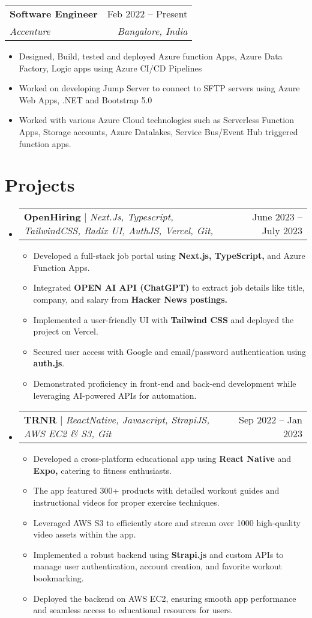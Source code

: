 \documentclass[letterpaper,11pt]{article}
\makeatletter
\newcommand{\resumeItem}[1]{
  \item\small{
    {#1 \vspace{-2pt}}
  }
}
\newcommand{\resumeSubheading}[4]{
  \vspace{-2pt}\item
    \begin{tabular*}{0.97\textwidth}[t]{l@{\extracolsep{\fill}}r}
      \textbf{#1} & #2 \\
      \textit{\small#3} & \textit{\small #4} \\
    \end{tabular*}\vspace{-7pt}
}
\newcommand{\resumeSubSubheading}[2]{
    \item
    \begin{tabular*}{0.97\textwidth}{l@{\extracolsep{\fill}}r}
      \textit{\small#1} & \textit{\small #2} \\
    \end{tabular*}\vspace{-7pt}
}
\newcommand{\resumeProjectHeading}[2]{
    \item
    \begin{tabular*}{0.97\textwidth}{l@{\extracolsep{\fill}}r}
      \small#1 & #2 \\
    \end{tabular*}\vspace{-7pt}
}
\newcommand{\resumeSubHeadingListStart}{\begin{itemize}[leftmargin=0.15in, label={}]}
\newcommand{\resumeSubHeadingListEnd}{\end{itemize}}
\newcommand{\resumeItemListStart}{\begin{itemize}}
\newcommand{\resumeItemListEnd}{\end{itemize}\vspace{-5pt}}
\makeatother
\begin{document}
    \resumeSubheading
      {Software Engineer}{Feb 2022 -- Present}
      {Accenture}{Bangalore, India}
      \resumeItemListStart
        \resumeItem{Designed, Build, tested and deployed Azure function Apps, Azure Data Factory, Logic apps using Azure CI/CD Pipelines}
        \resumeItem{Worked on developing Jump Server to connect to SFTP servers using Azure Web Apps, .NET and Bootstrap 5.0}
        \resumeItem{Worked with various Azure Cloud technologies such as Serverless Function Apps, Storage accounts, Azure Datalakes, Service Bus/Event Hub triggered function apps.}
      \resumeItemListEnd
      



\section{Projects}
    \resumeSubHeadingListStart
      \resumeProjectHeading
          {\textbf{OpenHiring} $|$ \emph{Next.Js, Typescript, TailwindCSS, Radix UI, AuthJS, Vercel, Git, }}{June 2023 -- July 2023}
          
          \resumeItemListStart
            \resumeItem{Developed a full-stack job portal using \textbf{Next.js, TypeScript,} and Azure Function Apps.}
            \resumeItem{Integrated \textbf{OPEN AI API (ChatGPT)} to extract job details like title, company, and salary from \textbf{Hacker News postings.}}
            \resumeItem{Implemented a user-friendly UI with \textbf{Tailwind CSS} and deployed the project on Vercel.}
            \resumeItem{Secured user access with Google and email/password authentication using \textbf{auth.js}.}
            \resumeItem{Demonstrated proficiency in front-end and back-end development while leveraging AI-powered APIs for automation.}
          \resumeItemListEnd
      \resumeProjectHeading
          {\textbf{TRNR} $|$ \emph{ReactNative, Javascript, StrapiJS, AWS EC2 \& S3, Git}}{Sep 2022 -- Jan 2023}
          
          \resumeItemListStart
            \resumeItem{Developed a cross-platform educational app using \textbf{React Native} and \textbf{Expo,} catering to fitness enthusiasts.}
            \resumeItem{The app featured 300+ products with detailed workout guides and instructional videos for proper exercise techniques.}
            \resumeItem{Leveraged AWS S3 to efficiently store and stream over 1000 high-quality video assets within the app.}
            \resumeItem{Implemented a robust backend using \textbf{Strapi.js} and custom APIs to manage user authentication, account creation, and favorite workout bookmarking.}
             \resumeItem{Deployed the backend on AWS EC2, ensuring smooth app performance and seamless access to educational resources for users.}
          \resumeItemListEnd
    \resumeSubHeadingListEnd
\end{document}
